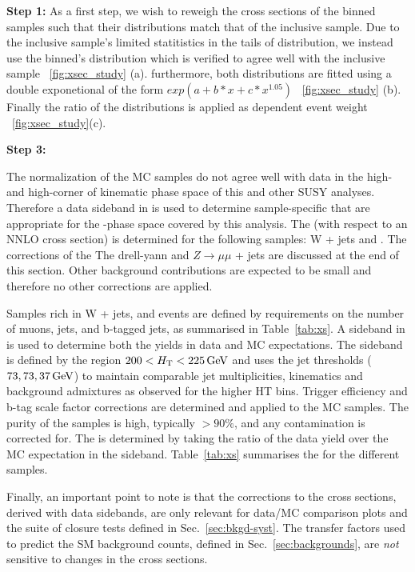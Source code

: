 {\bf Step 1:} 
As a first step, we wish to reweigh the cross sections of the \partonht binned samples such that
their \partonht distributions match that of the inclusive sample. Due to
the inclusive sample's limited statitistics in the tails of \scalht distribution, 
we instead use the \nparton binned's \partonht distribution which is verified to agree well 
with the inclusive sample ~\ref{fig:xsec_study} (a).  furthermore, both distributions 
are fitted using a double exponetional of the form $exp(a+b*x + c*x^{1.05})$
~\ref{fig:xsec_study} (b). Finally the ratio of the distributions is applied as 
\partonht dependent event weight ~\ref{fig:xsec_study}(c).

{\bf Step 3:} 

The normalization of the MC samples do not agree well with data in 
the high-\scalht and high-\met corner of kinematic phase space of
this and other SUSY analyses.  Therefore a data sideband in \scalht is used
to determine sample-specific \kfactors that are appropriate for the
\scalht-\met phase space covered by this analysis. The \kfactor (with
respect to an NNLO cross section) is determined for the following
samples: W + jets and \ttbar. The corrections of the The drell-yann 
and $Z\rightarrow\mu\mu$ + jets are discussed at the end of this section.
Other background contributions are expected to be small and therefore no other
corrections are applied. 

Samples rich in W + jets, and \ttbar events are defined by requirements 
on the number of muons, jets, and b-tagged jets, as summarised in Table~\ref{tab:xs}. A
sideband in \scalht is used to determine both the yields in data and
MC expectations. The sideband is defined by the region $200 < \mbox{$H_\text{T}$}
< 225\,\text{Ge\hspace{-.08em}V}$ and uses the jet \pt thresholds ($73,73,37\,\text{Ge\hspace{-.08em}V}$) to maintain 
comparable jet multiplicities, kinematics and background admixtures as observed for the
higher HT bins. Trigger efficiency and b-tag scale factor corrections 
are determined and applied to the MC samples. The purity of the samples 
is high, typically $>90\%$, and any contamination is corrected for. 
The \kfactor is determined by taking the ratio of the data yield over 
the MC expectation in the sideband. Table~\ref{tab:xs} summarises the \kfactors for the
different samples. 

Finally, an important point to note is that the corrections to the
cross sections, derived with data sidebands, are only relevant for
data/MC comparison plots and the suite of closure tests defined in
Sec.~\ref{sec:bkgd-syst}. The transfer factors used to predict the SM
background counts, defined in Sec.~\ref{sec:backgrounds}, are {\it
  not} sensitive to changes in the cross sections.

